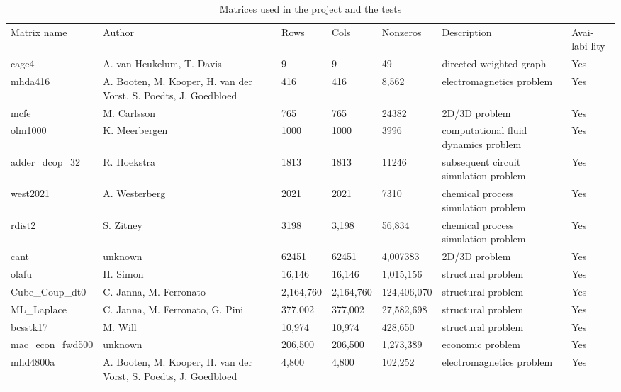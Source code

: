 \documentclass{scrreprt}
\begin{document}
\begin{longtable}[h!]{ |s|p{2cm}|p{1.3cm}|p{1.3cm}|p{1.5cm}|p{2cm}|p{0.5cm}|  }
\caption{Matrices used in the project and the tests} \\
\hline


  \\
\hline

Matrix name & Author &Rows &Cols &Nonzeros & Description & Avai-labi-lity \\
\hline
cage4 & A. van Heukelum, T. Davis &9 & 9 &49 & directed weighted graph &  Yes   \\

mhda416 & A. Booten, M. Kooper, H. van der Vorst, S. Poedts, J. Goedbloed &416 & 416 &8,562 & electromagnetics problem &  Yes   \\
mcfe & 	M. Carlsson &765 & 765 &24382 & 2D/3D problem &  Yes   \\
olm1000 & 	K. Meerbergen &1000 & 1000 &3996 & computational fluid dynamics problem &  Yes   \\
adder_dcop_32 & 	R. Hoekstra &1813 & 1813 &11246 & subsequent circuit simulation problem &  Yes   \\
west2021 & A. Westerberg &2021 & 2021 &7310 & chemical process simulation problem &  Yes   \\
rdist2 & 	S. Zitney &3198 & 3,198 &56,834& chemical process simulation problem &  Yes   \\
cant & unknown &62451& 62451 &4,007383 & 2D/3D problem &  Yes   \\
olafu & 	H. Simon &16,146 & 16,146 &1,015,156 & 	structural problem &  Yes   \\
Cube_Coup_dt0 & C. Janna, M. Ferronato &2,164,760 & 2,164,760 &124,406,070 & structural problem & Yes   \\
ML_Laplace & C. Janna, M. Ferronato, G. Pini &377,002 & 377,002 &27,582,698 & structural problem &  Yes   \\
bcsstk17 & M. Will &10,974 & 10,974 &428,650 & structural problem &  Yes   \\
mac_econ_fwd500 & 	unknown &206,500& 206,500 &1,273,389 & 	economic problem & Yes   \\
mhd4800a & 	A. Booten, M. Kooper, H. van der Vorst, S. Poedts, J. Goedbloed &4,800 & 4,800 &102,252 & electromagnetics problem &  Yes   \\

\end{longtable}
\end{document}
